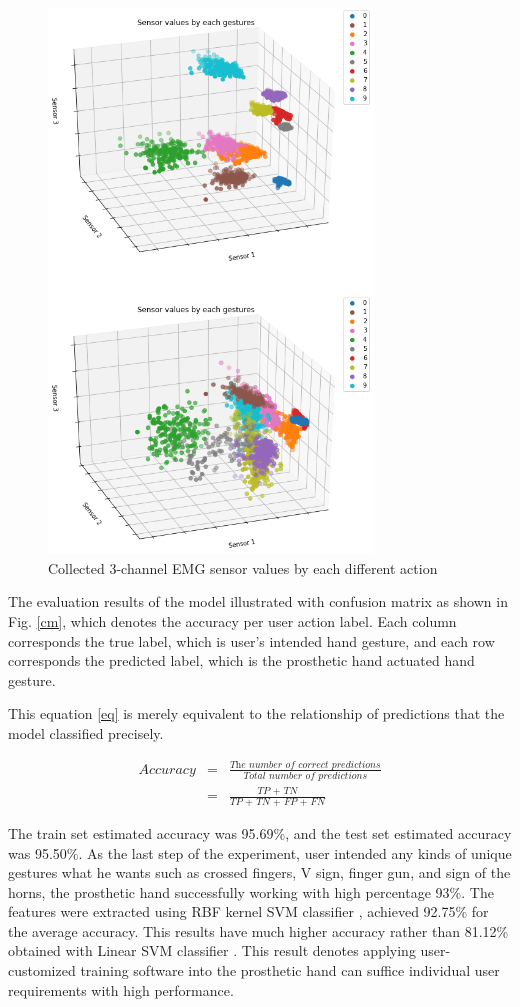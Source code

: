 \documentclass[conference]{IEEEtran}
\begin{document}
\begin{figure}[h]
  \centering
  \includegraphics[width=3.4in]{pretty_f.png}
  \caption{Collected 3-channel EMG sensor values by each different action}
  \label{3dplot}
\end{figure}


The evaluation results of the model illustrated with confusion matrix as shown in Fig. \ref{cm}, which denotes the accuracy per user action label. Each column corresponds the true label, which is user's intended hand gesture, and each row corresponds the predicted label, which is the prosthetic hand actuated hand gesture.

This equation \eqref{eq} is merely equivalent to the relationship of predictions that the model classified precisely.

\begin{eqnarray}
  Accuracy & = & \frac{\textit{The number of correct predictions}}{\textit{Total number of predictions}} \\[1ex]
   & = & \frac{\textit{TP + TN}}{\textit{TP + TN + FP + FN}}
    \label{eq}
\end{eqnarray}



The train set estimated accuracy was 95.69\%, and the test set estimated accuracy was 95.50\%. As the last step of the experiment, user intended any kinds of unique gestures what he wants such as crossed fingers, V sign, finger gun, and sign of the horns, the prosthetic hand successfully working with high percentage 93\%. The features were extracted using RBF kernel SVM classifier \cite{ML1}\cite{ML2}, achieved 92.75\% for the average accuracy. This results have much higher accuracy rather than 81.12\% obtained with Linear SVM classifier \cite{EEG}. This result denotes applying user-customized training software into the prosthetic hand can suffice individual user requirements with high performance.
\end{document}
